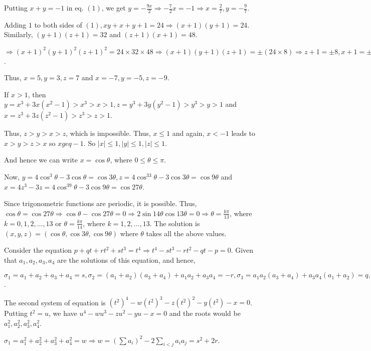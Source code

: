   Putting $x + y = -1$ in eq. $(1)$, we get $y = -\frac{9x}{2} \Rightarrow -\frac{7}{2}x = -1 \Rightarrow x
  = \frac{2}{7}, y = -\frac{9}{7}$.
\item Adding $1$ to both sides of $(1), xy + x + y + 1 = 24 \Rightarrow (x + 1)(y + 1) = 24$. Similarly, $(y
  + 1)(z + 1) = 32$ and $(z + 1)(x + 1) = 48$.

  $\Rightarrow (x + 1)^2(y + 1)^2(z + 1)^2 = 24 \times32\times48 \Rightarrow (x + 1)(y + 1)(z + 1) =
  \pm(24\times 8) \Rightarrow z + 1 = \pm8, x + 1 = \pm6, y + 1 = \pm4$.

  Thus, $x = 5, y = 3, z = 7$ and $x = -7, y = -5, z = -9$.
\item If $x > 1$, then $y = x^3 + 3x(x^2 - 1) > x^3 > x > 1, z = y^3 + 3y(y^2 - 1) > y^3 > y > 1$ and $x =
  z^3 + 3z(z^2 - 1) > z^3 > z > 1$.

  Thus, $z > y > x > z$, which is impossible. Thus, $x\leq 1$ and again, $x < -1$ leads to $x > y > z > x$
  so $x geq -1$. So $|x|\leq 1, |y|\leq 1, |z|\leq 1$.

  And hence we can write $x = \cos\theta$, where $0\leq\theta\leq\pi$.

  Now, $y = 4\cos^3\theta - 3\cos\theta = \cos3\theta, z = 4\cos^33\theta - 3\cos3\theta = \cos9\theta$ and
  $x = 4z^3 - 3z = 4\cos^39\theta - 3\cos9\theta = \cos27\theta$.

  Since trigonometric functions are periodic, it is possible. Thus, $\cos\theta = \cos27\theta \Rightarrow
  \cos\theta - \cos27\theta = 0 \Rightarrow 2\sin14\theta\cos13\theta = 0 \Rightarrow \theta =
  \frac{k\pi}{13}$, where $k = 0, 1, 2, \ldots, 13$ or $\theta = \frac{k\pi}{14}$, where $k = 1, 2, \ldots,
  13$. The solution is $(x, y, z) = (\cos\theta, \cos3\theta, \cos9\theta)$ where $\theta$ takes all the
  above values.
\item Consider the equation $p + qt + rt^2 + st^3 = t^4 \Rightarrow t^4 - st^3 - rt^2 - qt - p = 0$. Given
  that $a_1, a_2, a_3, a_4$ are the solutions of this equation, and hence,

  $\sigma_1 = a_1 + a_2 + a_3 + a_4 = s, \sigma_2 = (a_1 + a_2)(a_3 + a_4) + a_1a_2 + a_3a_4 = -r, \sigma_3
  = a_1a_2(a_3 + a_4) + a_3a_4(a_1 + a_2) = q, \sigma_4 = a_1a_2a_3a_4 = -p$.

  The second system of equation is $(t^2)^4 - w(t^2)^3 - z(t^2)^2 - y(t^2) - x = 0$. Putting $t^2 = u$, we
  have $u^4 - wu^3 - zu^2 - yu - x = 0$ and the roots would be $a_1^2, a_2^2, a_3^2, a_4^2$.

  $\sigma_1 = a_1^2 + a_2^2 + a_3^2 + a_4^2 = w \Rightarrow w = \displaystyle\left(\sum a_i\right)^2 -
  2\sum_{i<j}a_ia_j = s^2 + 2r$.

